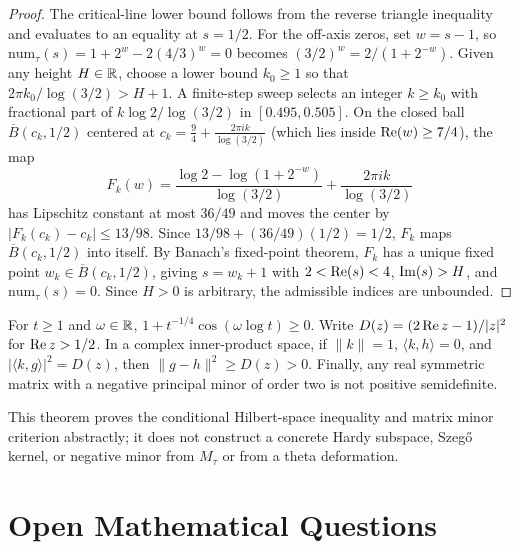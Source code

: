 \begin{proof}
The critical-line lower bound follows from the reverse triangle inequality and evaluates to an equality at $s = 1/2$. For the off-axis zeros, set $w = s - 1$, so $\mathrm{num}_\tau(s) = 1 + 2^w - 2(4/3)^w = 0$ becomes $(3/2)^w = 2 / (1 + 2^{-w})$. Given any height $H \in \mathbb{R}$, choose a lower bound $k_0 \ge 1$ so that $2\pi k_0 / \log(3/2) > H + 1$. A finite-step sweep selects an integer $k \ge k_0$ with fractional part of $k \log 2 / \log(3/2)$ in $[0.495, 0.505]$. On the closed ball $\overline{B}(c_k, 1/2)$ centered at $c_k = \frac{9}{4} + \frac{2\pi i k}{\log(3/2)}$ (which lies inside $\operatorname{Re}(w) \ge 7/4$), the map
\[
F_k(w) = \frac{\log 2 - \log(1 + 2^{-w})}{\log(3/2)} + \frac{2\pi i k}{\log(3/2)}
\]
has Lipschitz constant at most $36/49$ and moves the center by $|F_k(c_k) - c_k| \le 13/98$. Since $13/98 + (36/49)(1/2) = 1/2$, $F_k$ maps $\overline{B}(c_k, 1/2)$ into itself. By Banach's fixed-point theorem, $F_k$ has a unique fixed point $w_k \in \overline{B}(c_k, 1/2)$, giving $s = w_k + 1$ with $2 < \operatorname{Re}(s) < 4$, $\operatorname{Im}(s) > H$, and $\mathrm{num}_\tau(s) = 0$. Since $H > 0$ is arbitrary, the admissible indices are unbounded.
\end{proof}

\begin{theorem}
\label{thm:parity-pick}
\leanok
For $t \ge 1$ and $\omega \in \mathbb{R}$, $1 + t^{-1/4}\cos(\omega\log t) \ge 0$. Write $D(z) = (2\operatorname{Re} z - 1)/|z|^2$ for $\operatorname{Re} z > 1/2$. In a complex inner-product space, if $\|k\| = 1$, $\langle k, h \rangle = 0$, and $|\langle k, g \rangle|^2 = D(z)$, then $\|g - h\|^2 \ge D(z) > 0$. Finally, any real symmetric matrix with a negative principal minor of order two is not positive semidefinite.
\end{theorem}

This theorem proves the conditional Hilbert-space inequality and matrix minor criterion abstractly; it does not construct a concrete Hardy subspace, Szeg\H{o} kernel, or negative minor from $M_\tau$ or from a theta deformation.

\section{Open Mathematical Questions}
\label{sec:open-questions}

